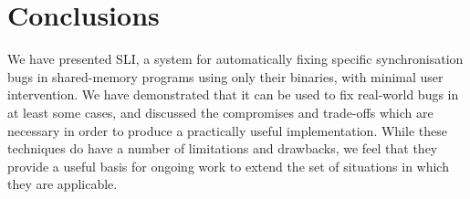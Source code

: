 \documentclass[10pt,a4paper,twocolumn]{article}
\begin{document}
\section{Conclusions}

We have presented SLI, a system for automatically fixing specific
synchronisation bugs in shared-memory programs using only their
binaries, with minimal user intervention.  We have demonstrated that
it can be used to fix real-world bugs in at least some cases, and
discussed the compromises and trade-offs which are necessary in order
to produce a practically useful implementation.  While these
techniques do have a number of limitations and drawbacks, we feel that
they provide a useful basis for ongoing work to extend the set of
situations in which they are applicable.



\end{document}
